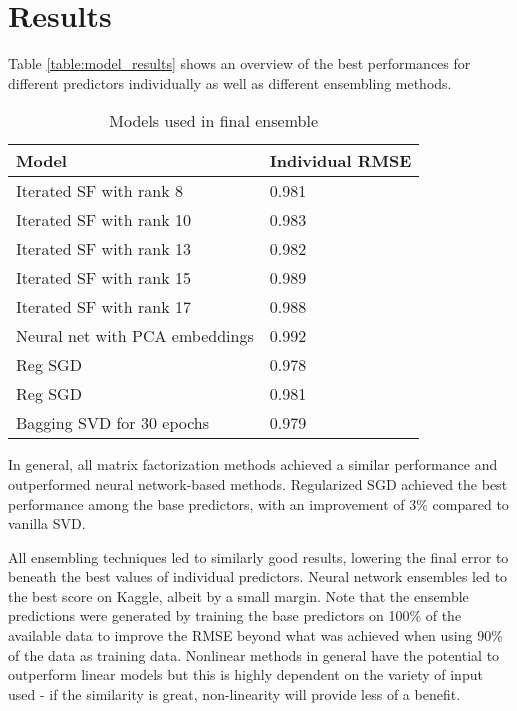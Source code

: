 \documentclass[10pt,conference,compsocconf]{IEEEtran}
\begin{document}



\section{Results}
\label{sec:results}

Table \ref{table:model_results} shows an overview of the best performances for different predictors individually as well as different ensembling methods.

\begin{table}[H]
\label{tab:final_ensemble_models}
\centering
\caption{Models used in final ensemble}
\begin{tabular}[t]{|l|l|}
\hline
Model & Individual RMSE \\ \hline \hline
Iterated SF with rank 8 & 0.981\\ \hline
Iterated SF with rank 10 & 0.983\\ \hline
Iterated SF with rank 13 & 0.982\\ \hline
Iterated SF with rank 15 & 0.989\\ \hline
Iterated SF with rank 17 & 0.988\\ \hline
Neural net with PCA embeddings & 0.992 \\ \hline
Reg SGD			&0.978\\ \hline
Reg SGD			&0.981\\ \hline
Bagging SVD for 30 epochs &0.979 \\ \hline
\end{tabular}
\end{table}


In general, all matrix factorization methods achieved a similar performance and outperformed neural network-based methods. Regularized SGD achieved the best performance among the base predictors, with an improvement of \(3\%\) compared to vanilla SVD.

All ensembling techniques led to similarly good results, lowering the final error to beneath the best values of individual predictors. Neural network ensembles led to the best score on Kaggle, albeit by a small margin. Note that the ensemble predictions were generated by training the base predictors on 100\% of the available data to improve the RMSE beyond what was achieved when using 90\% of the data as training data.
Nonlinear methods in general have the potential to outperform linear models but this is highly dependent on the variety of input used - if the similarity is great, non-linearity will provide less of a benefit.
\end{document}
